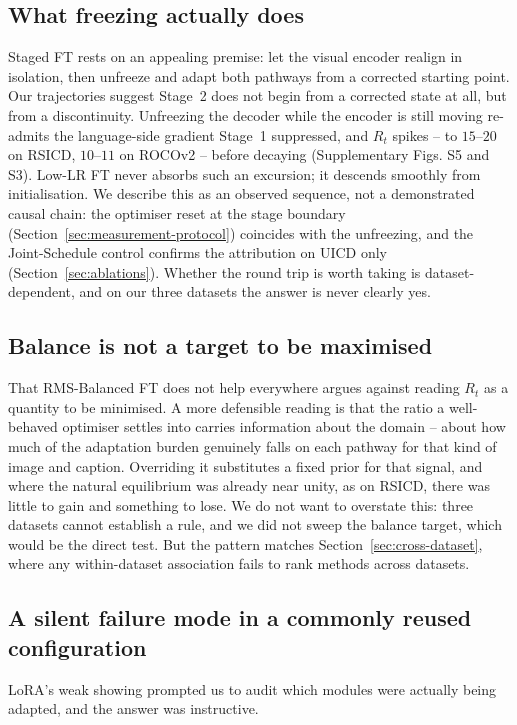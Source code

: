 \documentclass[journal]{IEEEtran}
\begin{document}
\subsection{What freezing actually does}
Staged FT rests on an appealing premise: let the visual encoder
realign in isolation, then unfreeze and adapt both pathways from a
corrected starting point. Our trajectories suggest Stage~2 does not
begin from a corrected state at all, but from a discontinuity.
Unfreezing the decoder while the encoder is still moving re-admits the language-side gradient Stage~1 suppressed, and $R_t$ spikes -- to $15$--$20$ on RSICD, $10$--$11$ on ROCOv2 -- before decaying (Supplementary Figs. S5 and S3). Low-LR FT never absorbs such an excursion; it descends smoothly from initialisation. We describe this as an observed sequence, not a demonstrated causal chain: the optimiser reset at the stage boundary
(Section~\ref{sec:measurement-protocol}) coincides with the
unfreezing, and the Joint-Schedule control confirms the attribution on UICD only (Section~\ref{sec:ablations}). Whether the round trip is worth taking is dataset-dependent, and on our three datasets the answer is never clearly yes.

\subsection{Balance is not a target to be maximised}
That RMS-Balanced FT does not help everywhere argues against reading $R_t$ as a quantity to be minimised. A more defensible reading is that the ratio a well-behaved optimiser settles into carries information about the domain -- about how much of the adaptation burden genuinely
falls on each pathway for that kind of image and caption. Overriding
it substitutes a fixed prior for that signal, and where the natural
equilibrium was already near unity, as on RSICD, there was little to
gain and something to lose. We do not want to overstate this: three
datasets cannot establish a rule, and we did not sweep the balance
target, which would be the direct test. But the pattern matches
Section~\ref{sec:cross-dataset}, where any within-dataset association fails to rank methods across datasets.

\subsection{A silent failure mode in a commonly reused configuration}
\label{sec:lora-finding}
LoRA's weak showing prompted us to audit which modules were
actually being adapted, and the answer was instructive.
\end{document}

